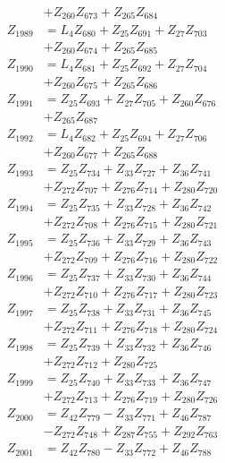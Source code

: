 \begin{multicols}{2}
\begin{align}
&+ Z_{260}Z_{673} + Z_{265}Z_{684} \nonumber \\
Z_{1989} &= L_4Z_{680} + Z_{25}Z_{691} + Z_{27}Z_{703}  \nonumber \\
&+ Z_{260}Z_{674} + Z_{265}Z_{685} \nonumber \\
Z_{1990} &= L_4Z_{681} + Z_{25}Z_{692} + Z_{27}Z_{704}  \nonumber \\
&+ Z_{260}Z_{675} + Z_{265}Z_{686} \nonumber \\
Z_{1991} &= Z_{25}Z_{693} + Z_{27}Z_{705} + Z_{260}Z_{676}  \nonumber \\
&+ Z_{265}Z_{687} \nonumber \\
Z_{1992} &= L_4Z_{682} + Z_{25}Z_{694} + Z_{27}Z_{706}  \nonumber \\
&+ Z_{260}Z_{677} + Z_{265}Z_{688} \nonumber \\
Z_{1993} &= Z_{25}Z_{734} + Z_{33}Z_{727} + Z_{36}Z_{741}  \nonumber \\
&+ Z_{272}Z_{707} + Z_{276}Z_{714} + Z_{280}Z_{720} \nonumber \\
Z_{1994} &= Z_{25}Z_{735} + Z_{33}Z_{728} + Z_{36}Z_{742}  \nonumber \\
&+ Z_{272}Z_{708} + Z_{276}Z_{715} + Z_{280}Z_{721} \nonumber \\
Z_{1995} &= Z_{25}Z_{736} + Z_{33}Z_{729} + Z_{36}Z_{743}  \nonumber \\
&+ Z_{272}Z_{709} + Z_{276}Z_{716} + Z_{280}Z_{722} \nonumber \\
Z_{1996} &= Z_{25}Z_{737} + Z_{33}Z_{730} + Z_{36}Z_{744}  \nonumber \\
&+ Z_{272}Z_{710} + Z_{276}Z_{717} + Z_{280}Z_{723} \nonumber \\
Z_{1997} &= Z_{25}Z_{738} + Z_{33}Z_{731} + Z_{36}Z_{745}  \nonumber \\
&+ Z_{272}Z_{711} + Z_{276}Z_{718} + Z_{280}Z_{724} \nonumber \\
Z_{1998} &= Z_{25}Z_{739} + Z_{33}Z_{732} + Z_{36}Z_{746}  \nonumber \\
&+ Z_{272}Z_{712} + Z_{280}Z_{725} \nonumber \\
Z_{1999} &= Z_{25}Z_{740} + Z_{33}Z_{733} + Z_{36}Z_{747}  \nonumber \\
&+ Z_{272}Z_{713} + Z_{276}Z_{719} + Z_{280}Z_{726} \nonumber \\
Z_{2000} &= Z_{42}Z_{779} - Z_{33}Z_{771} + Z_{46}Z_{787}  \nonumber \\
&- Z_{272}Z_{748} + Z_{287}Z_{755} + Z_{292}Z_{763} \nonumber \\
Z_{2001} &= Z_{42}Z_{780} - Z_{33}Z_{772} + Z_{46}Z_{788}  \nonumber \\

\end{align}
\end{multicols}
